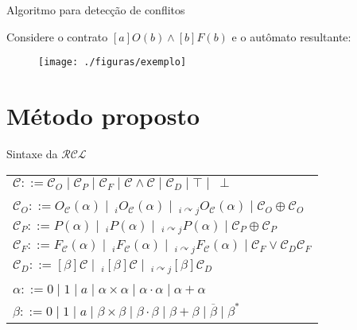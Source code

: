 \begin{frame}{Algoritmo para detecção de conflitos}
\begin{block}{}
Considere o contrato $[a]O(b) \wedge [b]F(b)$ e o autômato resultante:
\end{block}
\begin{figure}[ht]
\centering
\texttt{[image: ./figuras/exemplo]}
\end{figure}
\end{frame}




\section{Método proposto}


\begin{frame}{Sintaxe da $\mathcal{RCL}$}
    \begin{block}{}
        \centering
        \begin{tabular}{l}
            $\mathcal{C}::=\mathcal{C}_O \mid \mathcal{C}_P \mid \mathcal{C}_F \mid \mathcal{C} \wedge \mathcal{C} \mid \mathcal{C}_D\mid\top \mid\  \perp$\\\quad\\
            $\mathcal{C}_O::= O_\mathcal{C}(\alpha) \mid\ _iO_\mathcal{C}(\alpha) \mid \ _{i \curvearrowright  j}O_\mathcal{C}(\alpha) \mid \mathcal{C}_O \oplus \mathcal{C}_O$\\
            $\mathcal{C}_P::= P(\alpha) \mid \ _iP(\alpha) \mid \ _{i \curvearrowright  j}P(\alpha) \mid \mathcal{C}_P \oplus \mathcal{C}_P$\\
            $\mathcal{C}_F::=F_\mathcal{C}(\alpha) \mid \ _iF_\mathcal{C}(\alpha) \mid \ _{i \curvearrowright  j}F_\mathcal{C}(\alpha) \mid \mathcal{C}_F \vee \mathcal{C}_D \mathcal{C}_F$\\
            $\mathcal{C}_D ::=[\beta]\mathcal{C} \mid \ _i[\beta]\mathcal{C} \mid \ _{i \curvearrowright  j}[\beta]\mathcal{C}_D$\\\quad\\
            $\alpha::= 0 \mid 1 \mid a \mid \alpha \times \alpha \mid \alpha \cdot \alpha \mid \alpha + \alpha$\\
            $\beta::=  0 \mid 1 \mid a \mid \beta \times \beta \mid \beta \cdot \beta \mid \beta + \beta \mid \overline{\beta}  \mid \beta^*$
        \end{tabular}
    \end{block}
\end{frame}



